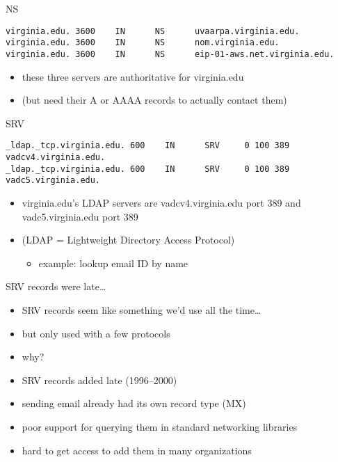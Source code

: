 \begin{frame}[fragile]{NS}
\begin{Verbatim}[fontsize=\small]
virginia.edu. 3600    IN      NS      uvaarpa.virginia.edu.
virginia.edu. 3600    IN      NS      nom.virginia.edu.
virginia.edu. 3600    IN      NS      eip-01-aws.net.virginia.edu.
\end{Verbatim}
\begin{itemize}
\item these three servers are authoritative for virginia.edu
\item (but need their A or AAAA records to actually contact them)
\end{itemize}
\end{frame}

\begin{frame}[fragile]{SRV}
\begin{Verbatim}[fontsize=\fontsize{9}{10}]
_ldap._tcp.virginia.edu. 600    IN      SRV     0 100 389 vadcv4.virginia.edu.
_ldap._tcp.virginia.edu. 600    IN      SRV     0 100 389 vadc5.virginia.edu.
\end{Verbatim}
\begin{itemize}
\item virginia.edu's LDAP servers are vadcv4.virginia.edu port 389 and vadc5.virginia.edu port 389
\item (LDAP = Lightweight Directory Access Protocol)
    \begin{itemize}
    \item example: lookup email ID by name
    \end{itemize}
\end{itemize}
\end{frame}

\begin{frame}{SRV records were late\ldots}
\begin{itemize}
\item SRV records seem like something we'd use all the time\ldots
\item but only used with a few protocols
\item why?
\vspace{.5cm}
\item SRV records added late (1996--2000)
\item sending email already had its own record type (MX)
\item poor support for querying them in standard networking libraries
\item hard to get access to add them in many organizations
\end{itemize}
\end{frame}

